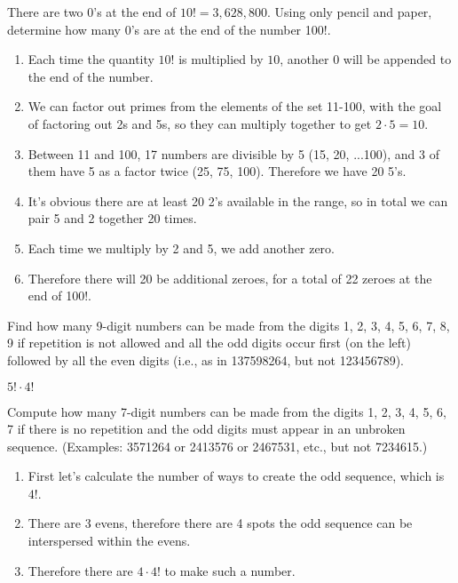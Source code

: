 \documentclass[openany, 11pt]{book}
\begin{document}
\begin{exercise}{}{}
	There are two 0’s at the end of $10! = 3,628,800$. Using
	only pencil and paper, determine how many 0’s are at the end of the number
	100!.
	\begin{enumerate}[label={\textbullet}, leftmargin=*, itemsep=0pt, parsep=0pt]
		\item Each time the quantity $10!$ is multiplied by $10$, another $0$ will be
		      appended to the end of the number.
		\item We can factor out primes from the elements of the set 11-100, with the goal
		      of factoring out 2s and 5s, so they can multiply together to get
		      $2\cdot5=10$.
		\item Between 11 and 100, 17 numbers are divisible by 5 (15, 20, ...100), and 3
		      of them have 5 as a factor twice (25, 75, 100). Therefore we have 20 5's.
		\item It's obvious there are at least 20 2's available in the range, so in total
		      we can pair 5 and 2 together 20 times.
		\item Each time we multiply by 2 and 5, we add another zero.
		\item Therefore there will 20 be additional zeroes, for a total of 22 zeroes at the end
		      of 100!.
	\end{enumerate}
\end{exercise}

\begin{exercise}{}{}
	Find how many 9-digit numbers can be made from the digits 1, 2, 3, 4, 5, 6, 7,
	8, 9 if repetition is not allowed and all the odd digits occur first (on the left)
	followed by all the even digits (i.e., as in 137598264, but not 123456789).

	$5! \cdot 4!$ \square
\end{exercise}

\begin{exercise}{}{}
	Compute how many 7-digit numbers can be made from the digits 1, 2, 3, 4, 5, 6, 7
	if there is no repetition and the odd digits must appear in an unbroken sequence.
	(Examples: 3571264 or 2413576 or 2467531, etc., but not 7234615.)
	\begin{enumerate}[label={\textbullet}, leftmargin=*, itemsep=0pt, parsep=0pt]
		\item First let's calculate the number of ways to create the odd sequence, which
		      is $4!$.
		\item There are 3 evens, therefore there are 4 spots the odd sequence can be
		      interspersed within the evens.
		\item Therefore there are $4\cdot 4!$ to make such a number.
		      \square
	\end{enumerate}
\end{exercise}
\end{document}
